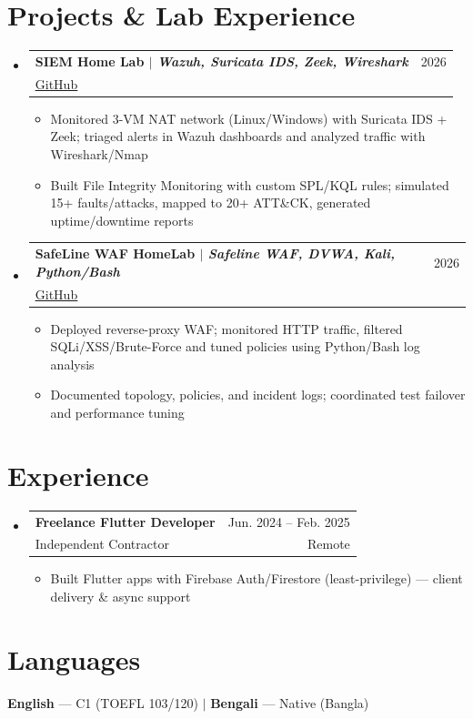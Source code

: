 \documentclass[a4paper,11pt]{article}
\makeatletter
\newcommand{\CVItem}[1]{\item\small{{#1 \vspace{-2pt}}}}
\newcommand{\CVSubheading}[4]{
  \vspace{-2pt}\item
    \begin{tabular*}{0.97\textwidth}[t]{l@{\extracolsep{\fill}}r}
      \textbf{#1} & #2 \\
      \small#3 & \small #4 \\
    \end{tabular*}\vspace{-7pt}
}
\newcommand{\CVSubHeadingListStart}{\begin{itemize}[leftmargin=0.5cm, label={}]}
\newcommand{\CVSubHeadingListEnd}{\end{itemize}}
\newcommand{\CVItemListStart}{\begin{itemize}}
\newcommand{\CVItemListEnd}{\end{itemize}\vspace{-5pt}}
\makeatother
\begin{document}
\section{Projects \& Lab Experience}
  \CVSubHeadingListStart
    \CVSubheading
      {{SIEM Home Lab} $|$ \emph{\small{Wazuh, Suricata IDS, Zeek, Wireshark}}}{2026}
      {\href{https://github.com/Sohanuzzaman3301/SIEM_Home_Lab}{\underline{GitHub}}}{}
      \CVItemListStart
        \CVItem{Monitored 3-VM NAT network (Linux/Windows) with Suricata IDS + Zeek; triaged alerts in Wazuh dashboards and analyzed traffic with Wireshark/Nmap}
        \CVItem{Built File Integrity Monitoring with custom SPL/KQL rules; simulated 15+ faults/attacks, mapped to 20+ ATT\&CK, generated uptime/downtime reports}
      \CVItemListEnd
    \CVSubheading
      {{SafeLine WAF HomeLab} $|$ \emph{\small{Safeline WAF, DVWA, Kali, Python/Bash}}}{2026}
      {\href{https://github.com/Sohanuzzaman3301/safeline-waf-homelab}{\underline{GitHub}}}{}
      \CVItemListStart
        \CVItem{Deployed reverse-proxy WAF; monitored HTTP traffic, filtered SQLi/XSS/Brute-Force and tuned policies using Python/Bash log analysis}
        \CVItem{Documented topology, policies, and incident logs; coordinated test failover and performance tuning}
      \CVItemListEnd
  \CVSubHeadingListEnd

\section{Experience}
  \CVSubHeadingListStart
    \CVSubheading
      {Freelance Flutter Developer}{Jun. 2024 -- Feb. 2025}
      {Independent Contractor}{Remote}
      \CVItemListStart
        \CVItem{Built Flutter apps with Firebase Auth/Firestore (least-privilege) — client delivery \& async support}
      \CVItemListEnd
  \CVSubHeadingListEnd

\section{Languages}
  \begin{itemize}[leftmargin=0.5cm, label={}]
     \small{\item{\textbf{English} — C1 (TOEFL 103/120) $|$ \textbf{Bengali} — Native (Bangla)}}
  \end{itemize}
\end{document}
